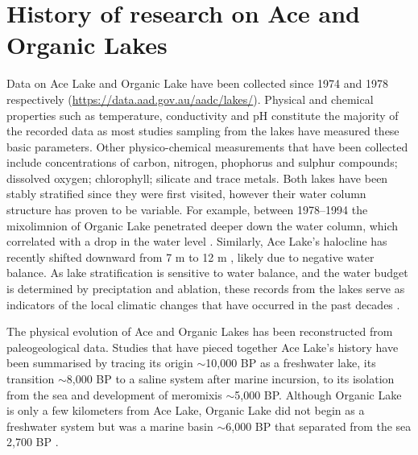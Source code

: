 \section{History of research on Ace and Organic Lakes}
Data on Ace Lake and Organic Lake have been collected since 1974 and 1978 respectively 
(\url{https://data.aad.gov.au/aadc/lakes/}).
Physical and chemical properties such as temperature, conductivity and pH constitute the majority of the recorded data as most studies sampling from the lakes have measured these basic parameters.
Other physico-chemical measurements that have been collected include concentrations of carbon, nitrogen, phophorus and sulphur compounds; dissolved oxygen; chlorophyll; silicate and trace metals.
Both lakes have been stably stratified since they were first visited, however their water column structure has proven to be variable.
For example, between 1978--1994 the mixolimnion of Organic Lake penetrated deeper down the water column, which correlated with a drop in the water level \cite{Gibson1995, Gibson1996}.
Similarly, Ace Lake's halocline has recently shifted downward from 7 m \cite{Rankin1999} to 12 m \cite{Lauro2011}, likely due to negative water balance.
As lake stratification is sensitive to water balance, and the water budget is determined by preciptation and ablation, these records from the lakes serve as indicators of the local climatic changes that have occurred in the past decades \cite{Gibson1995}.

The physical evolution of Ace and Organic Lakes has been reconstructed from paleogeological data.
Studies that have pieced together Ace Lake's history have been summarised by \citet{Rankin1999} tracing its origin $\sim$10,000 BP as a freshwater lake, its transition $\sim$8,000 BP to a saline system after marine incursion, to its isolation from the sea and development of meromixis $\sim$5,000 BP.
Although Organic Lake is only a few kilometers from Ace Lake, Organic Lake did not begin as a freshwater system but was a marine basin $\sim$6,000 BP that separated from the sea 2,700 BP \cite{Bird1991, Zwartz1998}.

